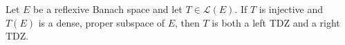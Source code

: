 Let $E$ be a reflexive Banach space and let $T \in \mathcal{L}(E)$. If $T$ is injective and $T(E)$ is a dense, proper subspace of $E$, then $T$ is both a left TDZ and a right TDZ.
